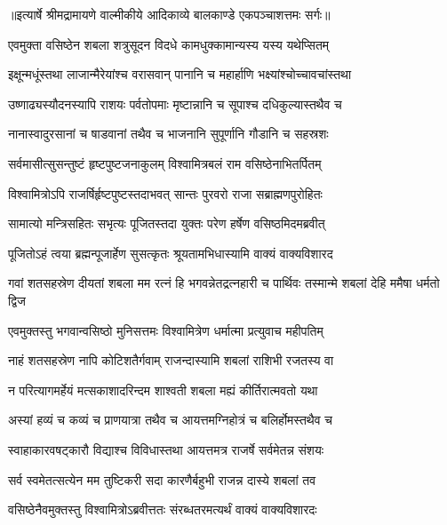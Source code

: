 {॥इत्यार्षे श्रीमद्रामायणे वाल्मीकीये आदिकाव्ये बालकाण्डे एकपञ्चाशत्तमः सर्गः॥}


\twolineshloka
{एवमुक्ता वसिष्ठेन शबला शत्रुसूदन}
{विदधे कामधुक्कामान्यस्य यस्य यथेप्सितम्} %

\twolineshloka
{इक्षून्मधूंस्तथा लाजान्मैरेयांश्च वरासवान्}
{पानानि च महार्हाणि भक्ष्यांश्चोच्चावचांस्तथा} %

\twolineshloka
{उष्णाढ्यस्यौदनस्यापि राशयः पर्वतोपमाः}
{मृष्टान्नानि च सूपाश्च दधिकुल्यास्तथैव च} %

\twolineshloka
{नानास्वादुरसानां च षाडवानां तथैव च}
{भाजनानि सुपूर्णानि गौडानि च सहस्रशः} %

\twolineshloka
{सर्वमासीत्सुसन्तुष्टं हृष्टपुष्टजनाकुलम्}
{विश्वामित्रबलं राम वसिष्ठेनाभितर्पितम्} %

\twolineshloka
{विश्वामित्रोऽपि राजर्षिर्हृष्टपुष्टस्तदाभवत्}
{सान्तः पुरवरो राजा सब्राह्मणपुरोहितः} %

\twolineshloka
{सामात्यो मन्त्रिसहितः सभृत्यः पूजितस्तदा}
{युक्तः परेण हर्षेण वसिष्ठमिदमब्रवीत्} %

\twolineshloka
{पूजितोऽहं त्वया ब्रह्मन्पूजार्हेण सुसत्कृतः}
{श्रूयतामभिधास्यामि वाक्यं वाक्यविशारद} %

\threelineshloka
{गवां शतसहस्रेण दीयतां शबला मम}
{रत्नं हि भगवन्नेतद्रत्नहारी च पार्थिवः}
{तस्मान्मे शबलां देहि ममैषा धर्मतो द्विज} %

\twolineshloka
{एवमुक्तस्तु भगवान्वसिष्ठो मुनिसत्तमः}
{विश्वामित्रेण धर्मात्मा प्रत्युवाच महीपतिम्} %

\twolineshloka
{नाहं शतसहस्रेण नापि कोटिशतैर्गवाम्}
{राजन्दास्यामि शबलां राशिभी रजतस्य वा} %

\twolineshloka
{न परित्यागमर्हेयं मत्सकाशादरिन्दम}
{शाश्वती शबला मह्यं कीर्तिरात्मवतो यथा} %

\twolineshloka
{अस्यां हव्यं च कव्यं च प्राणयात्रा तथैव च}
{आयत्तमग्निहोत्रं च बलिर्होमस्तथैव च} %

\twolineshloka
{स्वाहाकारवषट्कारौ विद्याश्च विविधास्तथा}
{आयत्तमत्र राजर्षे सर्वमेतन्न संशयः} %

\twolineshloka
{सर्व स्वमेतत्सत्येन मम तुष्टिकरी सदा}
{कारणैर्बहुभी राजन्न दास्ये शबलां तव} %

\twolineshloka
{वसिष्ठेनैवमुक्तस्तु विश्वामित्रोऽब्रवीत्ततः}
{संरब्धतरमत्यर्थं वाक्यं वाक्यविशारदः} %

